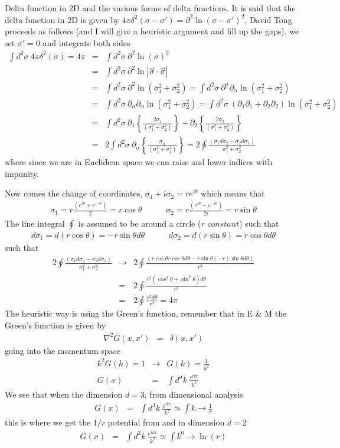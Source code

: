 \documentclass[aps,preprint,preprintnumbers,nofootinbib,showpacs,prd]{revtex4-1}
\newcommand{\nbea}{\begin{eqnarray*}}
\newcommand{\neea}{\end{eqnarray*}}
\begin{document}
Delta function in 2D and the various forms of delta functions. It is said that the delta function in 2D is given by $4\pi \delta^2(\sigma - \sigma') = \partial^2 \ln(\sigma - \sigma')^2$, David Tong proceeds as follows (and I will give a heuristic argument and fill up the gaps), we set $\sigma' = 0$ and integrate both sides
%
\nbea
\int d^2\sigma~ 4\pi \delta^2(\sigma) = 4\pi & = & \int d^2\sigma~\partial^2 \ln(\sigma)^2 \\
& = & \int d^2\sigma~\partial^2 \ln |\vec \sigma \cdot \vec \sigma| \\
& = & \int d^2\sigma~\partial^2 \ln (\sigma_1^2 + \sigma_2^2) = \int d^2\sigma~\partial^\alpha\partial_\alpha \ln (\sigma_1^2 + \sigma_2^2) \\
& = & \int d^2\sigma~\partial_\alpha\partial_\alpha \ln (\sigma_1^2 + \sigma_2^2) = \int d^2\sigma~(\partial_1\partial_1 + \partial_2\partial_2) \ln (\sigma_1^2 + \sigma_2^2) \\
& = & \int d^2\sigma~\partial_1 \left \{ \frac{2 \sigma_1}{ (\sigma_1^2 + \sigma_2^2) } \right \} + \partial_2 \left \{ \frac{2 \sigma_2}{ (\sigma_1^2 + \sigma_2^2) } \right \} \\
& = & 2 \int d^2\sigma~\partial_\alpha \left \{ \frac{\sigma_\alpha}{ (\sigma_1^2 + \sigma_2^2) } \right \} = 2 \oint \frac{(\sigma_1 d\sigma_2 - \sigma_2 d\sigma_1)}{ \sigma_1^2 + \sigma_2^2 } 
\neea
%
where since we are in Euclidean space we can raise and lower indices with impunity.

Now comes the change of coordinates, $\sigma_1 + i\sigma_2 = r e^{i\theta}$ which means that
%
\nbea
\sigma_1 = r \frac{(e^{i\theta} + e^{-i\theta})}{2} = r \cos\theta & ~~~~~~ & \sigma_2 = r \frac{(e^{i\theta} - e^{-i\theta})}{2i} = r \sin\theta
\neea
%
The line integral $\oint$ is assumed to be around a circle ($r$ $constant$) such that
%
\nbea
d\sigma_1 = d(r \cos\theta) = -r \sin\theta d\theta & ~~~~~~ & d\sigma_2 = d(r \sin\theta) = r \cos\theta d\theta
\neea
%
such that
%
\nbea
2 \oint \frac{(\sigma_1 d\sigma_2 - \sigma_2 d\sigma_1)}{ \sigma_1^2 + \sigma_2^2 } & \rightarrow & 2 \oint \frac{(r \cos\theta r \cos\theta d\theta - r \sin\theta(-r) \sin\theta d\theta )}{ r^2 } \\
& = & 2 \oint \frac{r^2 (\cos^2\theta + \sin^2\theta) d\theta}{ r^2 } \\
& = & 2 \oint \frac{r^2 d\theta}{ r^2 } = 4\pi
\neea
%
The heuristic way is using the Green's function, remember that in E \& M the Green's function is given by
%
\nbea
\nabla^2 G(x,x') & = & \delta(x,x')
\neea
%
going into the momentum space
%
\nbea
k^2 G(k) = 1 & \rightarrow & G(k) = \frac{1}{k^2} \\
G(x) & = & \int d^d k~ \frac{e^{ikx}}{k^2}
\neea
%
We see that when the dimension $d=3$, from dimensional analysis
%
\nbea
G(x) & = & \int d^3 k~ \frac{e^{ikx}}{k^2} \simeq \int k \rightarrow \frac{1}{r}
\neea
%
this is where we get the $1/r$ potential from and in dimension $d=2$
%
\nbea
G(x) & = & \int d^2 k~ \frac{e^{ikx}}{k^2} \simeq \int k^0 \rightarrow \ln(r)
\neea
%
\end{document}

